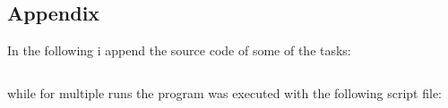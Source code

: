 \documentclass[12pt]{scrbook}
\begin{document}
\subsection{Appendix}
In the following i append the source code of some of the tasks:\\
\begin{lstlisting}[language=CodeBlocks]

\end{lstlisting}

while for multiple runs the program was executed with the following script file:
\begin{lstlisting}[language=CodeBlocks]
 
\end{lstlisting}
\end{document}
